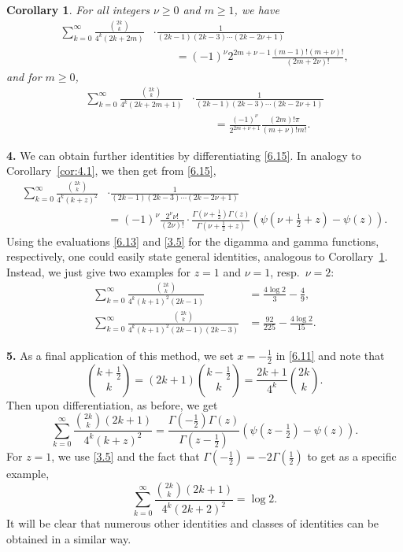 \documentclass{amsart}
\newtheorem{corollary}[theorem]{Corollary}
\theoremstyle{definition}
\theoremstyle{remark}
\numberwithin{equation}{section}
\begin{document}
\begin{corollary}\label{cor:6.4}
For all integers $\nu\geq 0$ and $m\geq 1$, we have
\begin{align}
\sum_{k=0}^\infty\frac{\binom{2k}{k}}{4^k(2k+2m)}
&\cdot\frac{1}{(2k-1)(2k-3)\cdots(2k-2\nu+1)}\label{6.16}\\
&\qquad=(-1)^\nu 2^{2m+\nu-1}\frac{(m-1)!(m+\nu)!}{(2m+2\nu)!},\nonumber
\end{align}
and for $m\geq 0$,
\begin{align}
\sum_{k=0}^\infty\frac{\binom{2k}{k}}{4^k(2k+2m+1)}
&\cdot\frac{1}{(2k-1)(2k-3)\cdots(2k-2\nu+1)}\label{6.17}\\
&\qquad=\frac{(-1)^\nu}{2^{2m+\nu+1}}\frac{(2m)!\pi}{(m+\nu)!m!}.\nonumber
\end{align}
\end{corollary}

{\bf 4.} We can obtain further identities by differentiating \eqref{6.15}. 
In analogy to Corollary~\ref{cor:4.1}, we then get from \eqref{6.15},
\begin{align}
\sum_{k=0}^\infty\frac{\binom{2k}{k}}{4^k(k+z)^2}
&\cdot\frac{1}{(2k-1)(2k-3)\cdots(2k-2\nu+1)}\label{6.18}\\
&=(-1)^\nu\frac{2^\nu\nu!}{(2\nu)!}
\cdot\frac{\Gamma(\nu+\frac{1}{2})\Gamma(z)}{\Gamma(\nu+\frac{1}{2}+z)}
\left(\psi(\nu+\tfrac{1}{2}+z)-\psi(z)\right).\nonumber
\end{align}
Using the evaluations \eqref{6.13} and \eqref{3.5} for the digamma and gamma
functions, respectively, one could easily state general identities, analogous
to Corollary~\ref{cor:6.4}. Instead, we just give two examples for $z=1$ and
$\nu=1$, resp.\ $\nu=2$:
\begin{align*}
\sum_{k=0}^\infty\frac{\binom{2k}{k}}{4^k(k+1)^2(2k-1)}
&=\frac{4\log{2}}{3}-\frac{4}{9},\\
\sum_{k=0}^\infty\frac{\binom{2k}{k}}{4^k(k+1)^2(2k-1)(2k-3)}
&=\frac{92}{225}-\frac{4\log{2}}{15}.
\end{align*}

{\bf 5.} As a final application of this method, we set $x=-\frac{1}{2}$ in
\eqref{6.11} and note that 
\[
\binom{k+\frac{1}{2}}{k} = (2k+1)\binom{k-\frac{1}{2}}{k}
=\frac{2k+1}{4^k}\binom{2k}{k}.
\]
Then upon differentiation, as before, we get
\[
\sum_{k=0}^\infty\frac{\binom{2k}{k}(2k+1)}{4^k(k+z)^2}
=\frac{\Gamma(-\frac{1}{2})\Gamma(z)}{\Gamma(z-\frac{1}{2})}
\left(\psi(z-\tfrac{1}{2})-\psi(z)\right).
\]
For $z=1$, we use \eqref{3.5} and the fact that 
$\Gamma(-\frac{1}{2})=-2\Gamma(\frac{1}{2})$ to get as a specific example,
\[
\sum_{k=0}^\infty\frac{\binom{2k}{k}(2k+1)}{4^k(2k+2)^2} = \log{2}.
\]
It will be clear that numerous other identities and classes of identities can
be obtained in a similar way.
\end{document}
